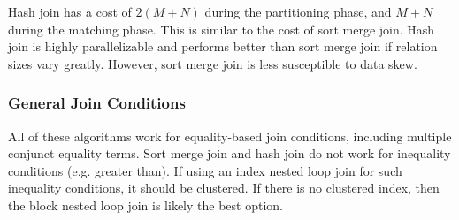 \documentclass[12pt,titlepage]{article}
\begin{document}
        Hash join has a cost of $2(M + N)$ during the partitioning phase, and $M + N$ during the matching phase. This is similar to the cost of sort merge join.
        Hash join is highly parallelizable and performs better than sort merge join if relation sizes vary greatly. However, sort merge join is less susceptible
        to data skew.

      \subsubsection{General Join Conditions}
        All of these algorithms work for equality-based join conditions, including multiple conjunct equality terms. Sort merge join and hash join do not work for
        inequality conditions (e.g. greater than). If using an index nested loop join for such inequality conditions, it should be clustered. If there is no clustered
        index, then the block nested loop join is likely the best option.
\end{document}
